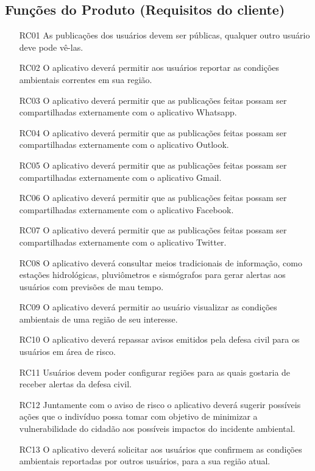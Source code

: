 \documentclass[12pt]{article}
\begin{document}
\subsection{Funções do Produto (Requisitos do cliente)} 
\begin{enumerate}
    \item [RC01] As publicações dos usuários devem ser públicas, qualquer outro usuário deve pode vê-las.
    \item [RC02] O aplicativo deverá permitir aos usuários reportar as condições ambientais correntes em sua região.
    \item [RC03] O aplicativo deverá permitir que as publicações feitas possam ser compartilhadas externamente com o aplicativo Whatsapp.
    \item [RC04] O aplicativo deverá permitir que as publicações feitas possam ser compartilhadas externamente com o aplicativo Outlook.
    \item [RC05] O aplicativo deverá permitir que as publicações feitas possam ser compartilhadas externamente com o aplicativo Gmail.
    \item [RC06] O aplicativo deverá permitir que as publicações feitas possam ser compartilhadas externamente com o aplicativo Facebook.
    \item [RC07] O aplicativo deverá permitir que as publicações feitas possam ser compartilhadas externamente com o aplicativo Twitter.
    \item [RC08] O aplicativo deverá consultar meios tradicionais de informação, como estações hidrológicas, pluviômetros e sismógrafos para gerar alertas aos usuários com previsões de mau tempo.
    \item [RC09] O aplicativo deverá permitir ao usuário visualizar as condições ambientais de uma região de seu interesse.
    \item [RC10] O aplicativo deverá repassar avisos emitidos pela defesa civil para os usuários em área de risco.
    \item [RC11] Usuários devem poder configurar regiões para as quais gostaria de receber alertas da defesa civil.
    \item [RC12] Juntamente com o aviso de risco o aplicativo deverá sugerir possíveis ações que o indivíduo possa tomar com objetivo de minimizar a vulnerabilidade do cidadão aos possíveis impactos do incidente ambiental.
    \item [RC13] O aplicativo deverá solicitar aos usuários que confirmem as condições ambientais reportadas por outros usuários, para a sua região atual.

\end{enumerate}
\end{document}
